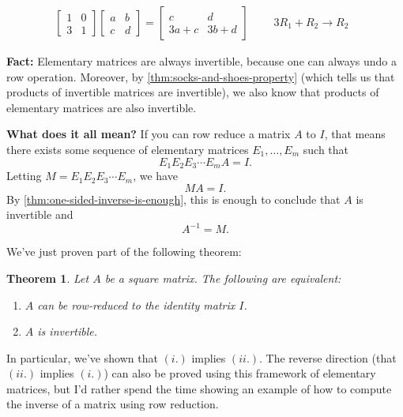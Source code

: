 \documentclass[10pt]{article}
\newtheorem{theorem}{Theorem}
\theoremstyle{definition}
\newcommand{\Fl}[1]{\vspace{5mm}\noindent\textbf{#1}}%
\begin{document}
\begin{align*}
  \begin{bmatrix}
    1&0\\
    3&1
  \end{bmatrix}
  \begin{bmatrix}
    a&b\\
    c&d
  \end{bmatrix}
  =
  \begin{bmatrix}
    c&d\\
    3a+c&3b+d
  \end{bmatrix}
  &&\text{ $3R_{1}+R_{2}\to R_{2}$ }
\end{align*}

\Fl{Fact:} Elementary matrices are always invertible, because one can always
undo a row operation. Moreover, by \cref{thm:socks-and-shoes-property} (which
tells us that products of invertible matrices are invertible), we also know
that products of elementary matrices are also invertible.

\Fl{What does it all mean?} If you can row reduce a matrix $A$ to $I$, that
means there exists some sequence of elementary matrices $E_{1},\ldots,E_{m}$
such that
\begin{equation*}
  E_{1}E_{2}E_{3}\cdots E_{m}A=I.
\end{equation*}
Letting $M= E_{1}E_{2}E_{3}\cdots E_{m}$, we have
\begin{equation*}
  MA=I.
\end{equation*}
By \cref{thm:one-sided-inverse-is-enough}, this is enough to conclude that $A$
is invertible and 
\begin{equation*}
  A^{-1} = M.
\end{equation*}

We've just proven part of the following theorem:

\begin{theorem}
  Let $A$ be a square matrix. The following are equivalent:
  \begin{enumerate}[label=(\roman*.)]
    \item $A$ can be row-reduced to the identity matrix $I$.
    \item $A$ is invertible.
  \end{enumerate}
\end{theorem}

In particular, we've shown that $(i.)$ implies $(ii.)$. The reverse direction
(that $(ii.)$ implies $(i.)$) can also be proved using this framework of
elementary matrices, but I'd rather spend the time showing an example of how
to compute the inverse of a matrix using row reduction.
\end{document}

